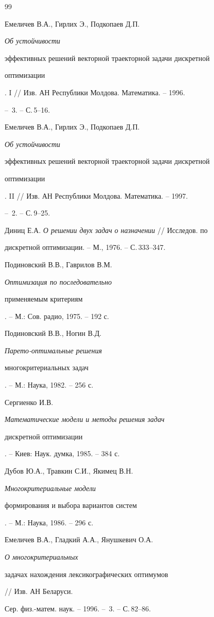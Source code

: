 \begin{thebibliography}{99}


Емеличев В.А., Гирлих Э., Подкопаев Д.П. {\em Об устойчивости 


эффективных решений векторной траекторной задачи дискретной 


оптимизации}. I // Изв. АН Республики Молдова. Математика. -- 1996. 


-- \No\,3. -- С.\,5--16. 




Емеличев В.А., Гирлих Э., Подкопаев Д.П. {\em Об устойчивости 


эффективных решений векторной траекторной задачи дискретной 


оптимизации}. II // Изв. АН Республики Молдова. Математика. -- 1997. 


-- \No\,2. -- С.\,9--25. 




Диниц Е.А. {\em О решении двух задач о назначении} // Исследов. по 


дискретной оптимизации. -- М., 1976. -- С.\,333--347. 




Подиновский В.В., Гаврилов В.М. {\em Оптимизация по последовательно 


применяемым критериям}. -- М.: Сов. радио, 1975. -- 192 с. 




Подиновский В.В., Ногин В.Д. {\em Парето-оптимальные решения 


многокритериальных задач}. -- М.: Наука, 1982. -- 256 с. 




Сергиенко И.В. {\em Математические модели и методы решения задач 


дискретной оптимизации}. -- Киев: Наук. думка, 1985. -- 384 с. 




Дубов Ю.А., Травкин С.И., Якимец В.Н. {\em Многокритериальные модели 


формирования и выбора вариантов систем}. -- М.: Наука, 1986. -- 296 с. 




Емеличев В.А., Гладкий А.А., Янушкевич О.А. {\em О многокритериальных 


задачах нахождения лексикографических оптимумов} // Изв. АН Беларуси. 


Сер. физ.-матем. наук. -- 1996. -- \No\,3. -- С.\,82--86. 



\end{thebibliography}
